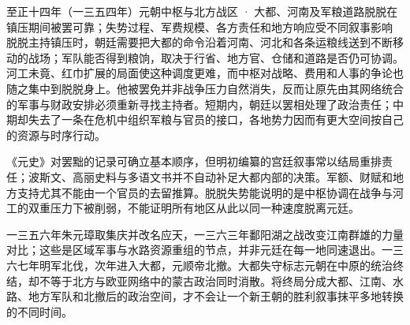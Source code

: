\begin{event}{}{至正十四年（一三五四年）}{元朝中枢与北方战区 · 大都、河南及军粮道路}{脱脱在镇压期间被罢可靠；失势过程、军费规模、各方责任和地方响应受不同叙事影响}
脱脱主持镇压时，朝廷需要把大都的命令沿着河南、河北和各条运粮线送到不断移动的战场；军队能否得到粮饷，取决于行省、地方官、仓储和道路是否仍可协调。河工未竟、红巾扩展的局面使这种调度更难，而中枢对战略、费用和人事的争论也随之集中到脱脱身上。他被罢免并非战争压力自然消失，反而让原先由其网络统合的军事与财政安排必须重新寻找主持者。短期内，朝廷以罢相处理了政治责任；中期却失去了一条在危机中组织军粮与官员的接口，各地势力因而有更大空间按自己的资源与时序行动。

《元史》对罢黜的记录可确立基本顺序，但明初编纂的宫廷叙事常以结局重排责任；波斯文、高丽史料与多语文书并不自动补足大都内部的决策。军额、财赋和地方支持尤其不能由一个官员的去留推算。脱脱失势能说明的是中枢协调在战争与河工的双重压力下被削弱，不能证明所有地区从此以同一种速度脱离元廷。
\end{event}

一三五六年朱元璋取集庆并改名应天，一三六三年鄱阳湖之战改变江南群雄的力量对比；这些是区域军事与水路资源重组的节点，并非元廷在每一地同速退出。一三六七年明军北伐，次年进入大都，元顺帝北撤。大都失守标志元朝在中原的统治终结，却不等于北方与欧亚网络中的蒙古政治同时消散。将终局分成大都、江南、水路、地方军队和北撤后的政治空间，才不会让一个新王朝的胜利叙事抹平多地转换的不同时间。







